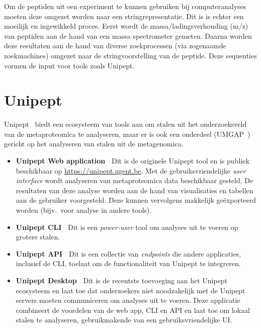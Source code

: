 Om de peptiden uit een experiment te kunnen gebruiken bij computeranalyses moeten deze omgezet worden naar een stringrepresentatie.
Dit is is echter een moeilijk en ingewikkeld proces.
Eerst wordt de massa/ladingsverhouding (m/z) van peptiden aan de hand van een massa spectrometer gemeten.
Daarna worden deze resultaten aan de hand van diverse zoekprocessen (via zogenaamde zoekmachines) omgezet naar de stringvoorstelling van de peptide.
Deze sequenties vormen de input voor tools zoals Unipept.

\section{Unipept}\label{sec:unipept-introductie}
Unipept~\cite{unipept_orig} biedt een ecosysteem van tools aan om stalen uit het onderzoeksveld van de metaproteomica te analyseren, maar er is ook een onderdeel (UMGAP~\cite{UMGAP_paper}) gericht op het analyseren van stalen uit de metagenomica.

\begin{itemize}
    \item \textbf{Unipept Web application~\cite{unipept_orig, unipept_web, unipept_tutorial, unipept_4}} Dit is de originele Unipept tool en is publiek beschikbaar op \url{https://unipept.ugent.be}.
    Met de gebruiksvriendelijke \textit{user interface} wordt analyseren van metaproteomica data beschikbaar gesteld.
    De resultaten van deze analyse worden aan de hand van visualisaties en tabellen aan de gebruiker voorgesteld.
    Deze kunnen vervolgens makkelijk geëxporteerd worden (bijv.~voor analyse in andere tools).
    \item \textbf{Unipept CLI~\cite{unipept_cli}} Dit is een \textit{power-user} tool om analyses uit te voeren op grotere stalen.
    \item \textbf{Unipept API~\cite{unipept_api}} Dit is een collectie van \textit{endpoints} die andere applicaties, inclusief de CLI, toelaat om de functionaliteit van Unipept te integreren.
    \item \textbf{Unipept Desktop~\cite{unipept_desktop}} Dit is de recentste toevoeging aan het Unipept ecosysteem en laat toe dat onderzoekers niet noodzakelijk met de Unipept servers moeten communiceren om analyses uit te voeren.
    Deze applicatie combineert de voordelen van de web app, CLI en API en laat toe om lokaal stalen te analyseren, gebruikmakende van een gebruiksvriendelijke UI\@.

\end{itemize}

